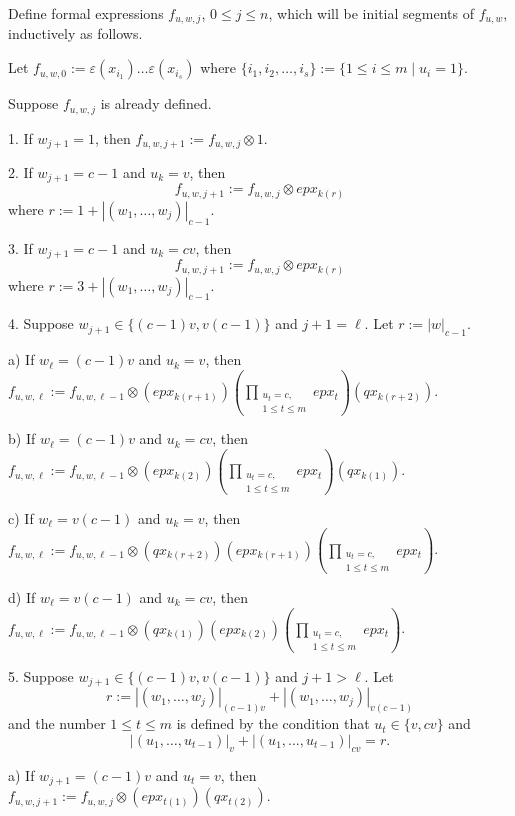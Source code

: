 \documentclass[12pt, reqno, a4paper]{amsart}
\theoremstyle{plain}
\theoremstyle{remark}
\theoremstyle{definition}
\numberwithin{equation}{section}
\begin{document}
Define formal expressions $f_{u,w,j}$, $0\leqslant j \leqslant n$, which will be initial segments of $f_{u,w}$, inductively as follows.

Let $f_{u,w,0} := \varepsilon(x_{i_1}) \ldots \varepsilon(x_{i_s})$
where $\lbrace i_1, i_2, \ldots, i_s \rbrace := \lbrace 1\leqslant i \leqslant m \mid
u_i=1\rbrace$.

Suppose $f_{u,w,j}$ is already defined.

1. If $w_{j+1} = 1$, then $f_{u,w,j+1} := f_{u,w,j} \otimes 1$.

2. If $w_{j+1} = c-1$ and $u_k = v$, 
then $$f_{u,w,j+1} := f_{u,w,j} \otimes epx_{k(r)}$$ where $r:= 1+ |(w_1, \ldots, w_j)|_{c-1}$.

3. If $w_{j+1} = c-1$ and $u_k = cv$, 
then $$f_{u,w,j+1} := f_{u,w,j} \otimes epx_{k(r)}$$ where $r:= 3+ |(w_1, \ldots, w_j)|_{c-1}$.

4. Suppose $w_{j+1}\in \lbrace (c-1)v, v(c-1)\rbrace$ and $j+1 = \ell$.
Let $r:= |w|_{c-1}$.

a) If $w_\ell = (c-1)v$ and $u_k = v$, 
then $f_{u,w,\ell} := f_{u,w,\ell-1} \otimes (epx_{k(r+1)})\left(\prod\limits_{\substack{u_t = c,\\ 1\leqslant t \leqslant m}} epx_t\right) (qx_{k(r+2)})$.

b) If $w_\ell = (c-1)v$ and $u_k = cv$, 
then $f_{u,w,\ell} := f_{u,w,\ell-1} \otimes (epx_{k(2)})\left(\prod\limits_{\substack{u_t = c,\\ 1\leqslant t \leqslant m}} epx_t\right) (qx_{k(1)})$.

c) If $w_\ell = v(c-1)$ and $u_k = v$, 
then $f_{u,w,\ell} := f_{u,w,\ell-1} \otimes (qx_{k(r+2)})(epx_{k(r+1)})\left(\prod\limits_{\substack{u_t = c,\\ 1\leqslant t \leqslant m}} epx_t\right)$.

d) If $w_\ell = v(c-1)$ and $u_k = cv$, 
then $f_{u,w,\ell} := f_{u,w,\ell-1} \otimes (qx_{k(1)}) (epx_{k(2)})\left(\prod\limits_{\substack{u_t = c,\\ 1\leqslant t \leqslant m}} epx_t\right)$.

5. Suppose $w_{j+1}\in \lbrace (c-1)v, v(c-1)\rbrace$ and  $j+1 > \ell$. Let $$r:= |(w_1, \ldots, w_j)|_{(c-1)v} + 
|(w_1, \ldots, w_j)|_{v(c-1)}$$ and the number $1\leqslant t \leqslant m$ is defined by the condition that
$u_t \in \lbrace v, cv \rbrace$ and $$|(u_1, \ldots, u_{t-1})|_v + |(u_1, \ldots, u_{t-1})|_{cv} =  r.$$

a) If $w_{j+1} = (c-1)v$ and $u_t = v$, 
then $f_{u,w,j+1} := f_{u,w,j} \otimes (epx_{t(1)})(qx_{t(2)})$.
\end{document}
